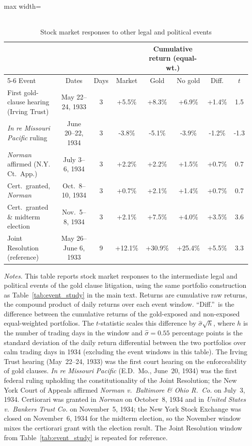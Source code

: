 \begin{table}[htbp]
\centering
\caption{\\ Stock market responses to other legal and political events}
\label{tab:other_events}
\footnotesize
\setlength{\tabcolsep}{4pt}
\medskip
\begin{adjustbox}{max width=\textwidth}
\begin{tabular}{lccccccc}
\toprule
 & & & & \multicolumn{2}{c}{Cumulative return (equal-wt.)} & & \\
\cmidrule(lr){5-6}
Event & Dates & Days & Market & Gold & No gold & Diff. & $t$ \\
\midrule
First gold-clause hearing (Irving Trust) & May 22--24, 1933 & 3 & +5.5\% & +8.3\% & +6.9\% & +1.4\% & 1.5 \\
\textit{In re Missouri Pacific} ruling & June 20--22, 1934 & 3 & -3.8\% & -5.1\% & -3.9\% & -1.2\% & -1.3 \\
\textit{Norman} affirmed (N.Y. Ct.\ App.) & July 3--6, 1934 & 3 & +2.2\% & +2.2\% & +1.5\% & +0.7\% & 0.7 \\
Cert.\ granted, \textit{Norman} & Oct.\ 8--10, 1934 & 3 & +0.7\% & +2.1\% & +1.4\% & +0.7\% & 0.7 \\
Cert.\ granted \& midterm election & Nov.\ 5--8, 1934 & 3 & +2.1\% & +7.5\% & +4.0\% & +3.5\% & 3.6 \\
\midrule
Joint Resolution (reference) & May 26--June 6, 1933 & 9 & +12.1\% & +30.9\% & +25.4\% & +5.5\% & 3.3 \\
\bottomrule
\end{tabular}
\end{adjustbox}
\medskip
\begin{minipage}{0.95\textwidth}\footnotesize \textit{Notes.} This table reports stock market responses to the intermediate legal and political events of the gold clause litigation, using the same portfolio construction as Table~\ref{tab:event_study} in the main text. Returns are cumulative raw returns, the compound product of daily returns over each event window. ``Diff.''\ is the difference between the cumulative returns of the gold-exposed and non-exposed equal-weighted portfolios. The $t$-statistic scales this difference by $\hat\sigma\sqrt{h}$, where $h$ is the number of trading days in the window and $\hat\sigma = 0.55$ percentage points is the standard deviation of the daily return differential between the two portfolios over calm trading days in 1934 (excluding the event windows in this table). The Irving Trust hearing (May~22--24, 1933) was the first court hearing on the enforceability of gold clauses. \textit{In re Missouri Pacific} (E.D.~Mo., June~20, 1934) was the first federal ruling upholding the constitutionality of the Joint Resolution; the New York Court of Appeals affirmed \textit{Norman v.\ Baltimore \& Ohio R.~Co.} on July~3, 1934. Certiorari was granted in \textit{Norman} on October~8, 1934 and in \textit{United States v.\ Bankers Trust Co.} on November~5, 1934; the New York Stock Exchange was closed on November~6, 1934 for the midterm election, so the November window mixes the certiorari grant with the election result. The Joint Resolution window from Table~\ref{tab:event_study} is repeated for reference.\end{minipage}
\end{table}
